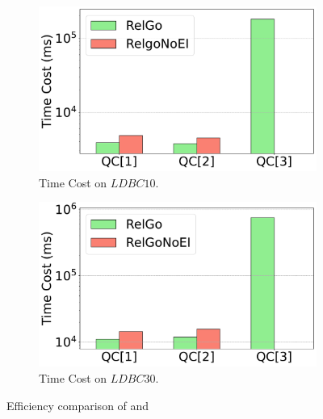 \begin{figure}[ht]
    \vspace{-1em}
    \centering
    \begin{subfigure}[b]{.45\linewidth}
        \centering
        \includegraphics[width=\linewidth]{./figures/exp/ablation_ei_sf10.pdf}
        \vspace{-1.5em}
        \caption{Time Cost on $LDBC10$.}
        \label{fig:exp-expand-intersect-sf10}
    \end{subfigure}
    \begin{subfigure}[b]{0.45\linewidth}
        \centering
        \includegraphics[width=\linewidth]{./figures/exp/ablation_ei_sf30.pdf}
        \vspace{-1.5em}
        \caption{Time Cost on $LDBC30$.}
        \label{fig:exp-expand-intersect-sf30}
    \end{subfigure}
    \caption{Efficiency comparison of \name and \relgomj}
    \label{fig:exp-expand-intersect}
\end{figure}


